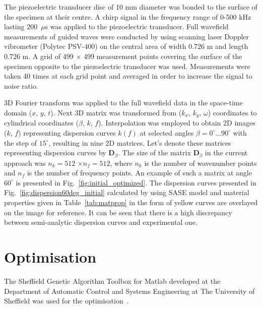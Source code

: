 \documentclass[preprint,12pt]{elsarticle}
\newcommand{\matr}[1]{\mathbf{#1}} %
\begin{document}
The piezoelectric transducer disc of 10 mm diameter  was bonded to the surface of the specimen at their centre. A chirp signal in the frequency range of 0-500 kHz lasting 200~$\mu$s was applied to the piezoelectric transducer. Full wavefield measurements of guided waves were conducted by using scanning laser Doppler vibrometer (Polytec PSV-400) on the central area of width 0.726 m and length 0.726 m. A grid of 499 $\times$ 499 measurement points covering the surface of the specimen opposite to the piezoelectric transducer was used. Measurements were taken 40 times at each grid point and averaged in order to increase the signal to noise ratio.

3D Fourier transform was applied to the full wavefield data in the space-time domain ($x$, $y$, $t$). Next 3D matrix was transformed from ($k_x$, $k_y$, $\omega$) coordinates to cylindrical coordinates ($\beta$, $k$, $f$). Interpolation was employed to obtain 2D images ($k$, $f$) representing dispersion curves $k(f)$ at selected angles $\beta = 0^{\circ} \ldots 90^{\circ}$ with the step of $15^{\circ}$, resulting in nine 2D matrices. Let's denote these matrices representing dispersion curves by $\matr{D}_{\beta}$. The size of the matrix  $\matr{D}_{\beta}$ in the current approach was $n_k=512$ $\times$$n_f= 512$, where $n_k$ is the number of wavenumber points and $n_f$ is the number of frequency points.  An example of such a matrix at angle $ 60^{\circ}$ is presented in Fig.~\ref{fig:initial_optimized}. The dispersion curves presented in Fig.~\ref{fig:dispersion60deg_initial} calculated by using SASE model and material properties given in Table~\ref{tab:matprop} in the form of yellow curves are overlayed on the image for reference. It can be seen that there is a high discrepancy between semi-analytic dispersion curves and experimental one. 
	\section{Optimisation \label{sec:optimization}}
	The Sheffield Genetic Algorithm Toolbox for Matlab developed at the Department of Automatic Control and Systems Engineering at The University of Sheffield was used for the optimisation~\cite{Chipperfield1994}.
	
\end{document}
